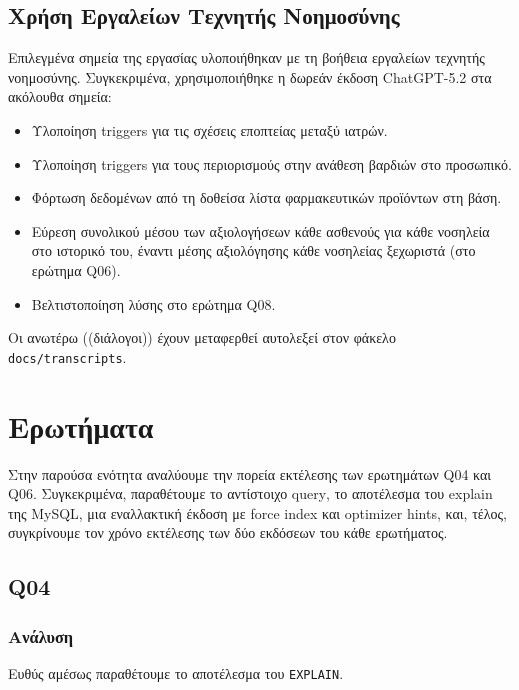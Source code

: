 \documentclass[13pt]{article}
\newcommand{\eng}[1]{\foreignlanguage{english}{#1}}
\newcommand{\langeng}{\selectlanguage{english}}
\newcommand{\langgrc}{\selectlanguage{greek}}
\begin{document}
\subsection{Χρήση Εργαλείων Τεχνητής Νοημοσύνης}
Επιλεγμένα σημεία της εργασίας υλοποιήθηκαν με τη βοήθεια εργαλείων τεχνητής νοημοσύνης. Συγκεκριμένα, χρησιμοποιήθηκε η δωρεάν έκδοση \eng{ChatGPT-5.2} στα ακόλουθα σημεία:

\begin{itemize}
\tightlist
\item
    Υλοποίηση \eng{triggers} για τις σχέσεις εποπτείας μεταξύ ιατρών.
\item
    Υλοποίηση \eng{triggers} για τους περιορισμούς στην ανάθεση βαρδιών στο προσωπικό.
\item
    Φόρτωση δεδομένων από τη δοθείσα λίστα φαρμακευτικών προϊόντων στη βάση.
\item
    Εύρεση συνολικού μέσου των αξιολογήσεων κάθε ασθενούς για κάθε νοσηλεία στο ιστορικό του, έναντι μέσης αξιολόγησης κάθε νοσηλείας ξεχωριστά (στο ερώτημα \eng{Q06}).
\item
    Βελτιστοποίηση λύσης στο ερώτημα \eng{Q08}.
\end{itemize}

\noindent Οι ανωτέρω ((διάλογοι)) έχουν μεταφερθεί αυτολεξεί στον φάκελο \eng{\texttt{docs/transcripts}}. 

\section{Ερωτήματα}
Στην παρούσα ενότητα αναλύουμε την πορεία εκτέλεσης των ερωτημάτων \eng{Q04} και \eng{Q06}. Συγκεκριμένα, παραθέτουμε το αντίστοιχο \eng{query}, το αποτέλεσμα του \eng{explain} της \eng{MySQL}, μια εναλλακτική έκδοση με \eng{force index} και \eng{optimizer hints}, και, τέλος, συγκρίνουμε τον χρόνο εκτέλεσης των δύο εκδόσεων του κάθε ερωτήματος.

\subsection{\eng{Q04}}
\langeng

\langgrc

\subsubsection{Ανάλυση}
Ευθύς αμέσως παραθέτουμε το αποτέλεσμα του \eng{\texttt{EXPLAIN}}.
\end{document}
